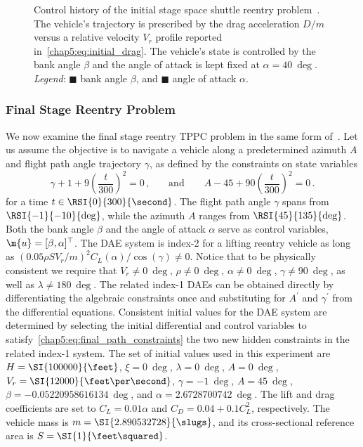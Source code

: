 \begin{figure}[htb]
  \centering
  \small{}
  \caption{Control history of the initial stage space shuttle reentry problem~\cite{brenan1995numerical}. The vehicle's trajectory is prescribed by the drag acceleration $D/m$ versus a relative velocity $V_r$ profile reported in~\eqref{chap5:eq:initial_drag}. The vehicle's state is controlled by the bank angle $\beta$ and the angle of attack is kept fixed at $\alpha = \SI{40}{\deg}$. \emph{Legend}: \textcolor{mycolor1}{$\blacksquare$} bank angle $\beta$, and \textcolor{mycolor2}{$\blacksquare$} angle of attack $\alpha$.}
  \label{chap5:fig:tppc_initial}
\end{figure}

\subsubsection{Final Stage Reentry Problem}

We now examine the final stage reentry \ac{TPPC} problem in the same form of~\cite{brenan1995numerical}. Let us assume the objective is to navigate a vehicle along a predetermined azimuth $A$ and flight path angle trajectory $\gamma$, as defined by the constraints on state variables
%
\begin{equation}
  \gamma + 1 + 9\left(\dfrac{t}{300}\right)^2 = 0 \, \text{,}
  \qquad \text{and} \qquad
  A - 45 + 90\left(\dfrac{t}{300}\right)^2 = 0 \, \text{.}
  \label{chap5:eq:final_path_constraints}
\end{equation}
%
for a time $t \in \RSI{0}{300}{\second}$. The flight path angle $\gamma$ spans from $\RSI{-1}{-10}{\deg}$, while the azimuth $A$ ranges from $\RSI{45}{135}{\deg}$. Both the bank angle $\beta$ and the angle of attack $\alpha$ serve as control variables, \ie{} $\m{u} = [\beta, \alpha]^\top$. The \ac{DAE} system is index-2 for a lifting reentry vehicle as long as $(0.05 \rho S V_r/m)^2 C_L(\alpha)/\cos(\gamma) \neq 0$. Notice that to be physically consistent we require that $V_r \neq \SI{0}{\deg}$, $\rho\neq \SI{0}{\deg}$, $\alpha \neq \SI{0}{\deg}$, $\gamma \neq \SI{90}{\deg}$, as well as $\lambda \neq \SI{180}{\deg}$. The related index-1 \acp{DAE} can be obtained directly by differentiating the algebraic constraints once and substituting for $A^\prime$ and $\gamma^\prime$ from the differential equations. Consistent initial values for the \ac{DAE} system are determined by selecting the initial differential and control variables to satisfy~\eqref{chap5:eq:final_path_constraints} the two new hidden constraints in the related index-1 system. The set of initial values used in this experiment are $H = \SI{100000}{\feet}$, $\xi = \SI{0}{\deg}$, $\lambda = \SI{0}{\deg}$, $A = \SI{0}{\deg}$, $V_r = \SI{12000}{\feet\per\second}$, $\gamma = \SI{-1}{\deg}$, $A = \SI{45}{\deg}$, $\beta = \SI{-0.05220958616134}{\deg}$, and $\alpha = \SI{2.6728700742}{\deg}$. The lift and drag coefficients are set to $C_L = 0.01\alpha$ and $C_D = 0.04 + 0.1C_L^2$, respectively. The vehicle mass is $m = \SI{2.890532728}{\slugs}$, and its cross-sectional reference area is $S = \SI{1}{\feet\squared}$.

